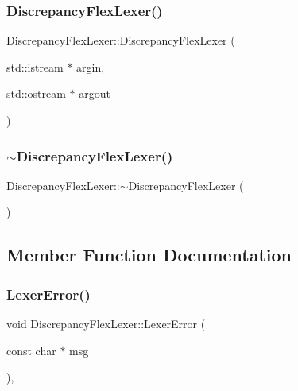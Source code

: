 \subsubsection{\texorpdfstring{Discrepancy\+Flex\+Lexer()}{DiscrepancyFlexLexer()}}
{\footnotesize\ttfamily Discrepancy\+Flex\+Lexer\+::\+Discrepancy\+Flex\+Lexer (\begin{DoxyParamCaption}\item[{std\+::istream $\ast$}]{argin,  }\item[{std\+::ostream $\ast$}]{argout }\end{DoxyParamCaption})}

\mbox{\label{structDiscrepancyFlexLexer_ae76e4e2727ed13d4bbe8dccc034c8ed2}} 
\subsubsection{\texorpdfstring{$\sim$\+Discrepancy\+Flex\+Lexer()}{~DiscrepancyFlexLexer()}}
{\footnotesize\ttfamily Discrepancy\+Flex\+Lexer\+::$\sim$\+Discrepancy\+Flex\+Lexer (\begin{DoxyParamCaption}{ }\end{DoxyParamCaption})\hspace{0.3cm}{\ttfamily [override]}}



\subsection{Member Function Documentation}
\mbox{\label{structDiscrepancyFlexLexer_a82526ebd7cb2e0e9d564a850e025b80d}} 
\subsubsection{\texorpdfstring{Lexer\+Error()}{LexerError()}}
{\footnotesize\ttfamily void Discrepancy\+Flex\+Lexer\+::\+Lexer\+Error (\begin{DoxyParamCaption}\item[{const char $\ast$}]{msg }\end{DoxyParamCaption})\hspace{0.3cm}{\ttfamily [inline]}, {\ttfamily [override]}}



